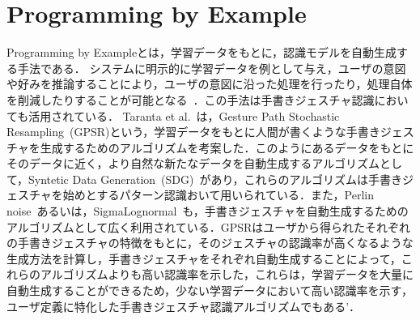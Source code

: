 \section{Programming by Example}
Programming by Exampleとは，学習データをもとに，認識モデルを自動生成する手法である．
システムに明示的に学習データを例として与え，ユーザの意図や好みを推論することにより，ユーザの意図に沿った処理を行ったり，処理自体を削減したりすることが可能となる~\cite{110003743975}．この手法は手書きジェスチャ認識においても活用されている．
Taranta et al.~\cite{Taranta:2016:RPA:2984511.2984525}は，Gesture Path Stochastic Resampling~(GPSR)という，学習データをもとに人間が書くような手書きジェスチャを生成するためのアルゴリズムを考案した．このようにあるデータをもとにそのデータに近く，より自然な新たなデータを自動生成するアルゴリズムとして，Syntetic Data Generation~(SDG)~\cite{conf/iccv/NavaratnamFC07,Shotton:2011:RHP:2191740.2192047,Galbally_syntheticgeneration,Lundin:2002:SFD:646280.687684,Gatos:2005:SAK:1106779.1106876,Rodriguez-Serrano:2012:SQH:2240326.2240755,Fischer:2013:GLS:2501115.2501123}があり，これらのアルゴリズムは手書きジェスチャを始めとするパターン認識おいて用いられている．また，Perlin noise~\cite{Perlin:1985:IS:325165.325247}あるいは，SigmaLognormal~\cite{SigmaLognormal}も，手書きジェスチャを自動生成するためのアルゴリズムとして広く利用されている．GPSRはユーザから得られたそれぞれの手書きジェスチャの特徴をもとに，そのジェスチャの認識率が高くなるような生成方法を計算し，手書きジェスチャをそれぞれ自動生成することによって，これらのアルゴリズムよりも高い認識率を示した，これらは，学習データを大量に自動生成することができるため，少ない学習データにおいて高い認識率を示す，ユーザ定義に特化した手書きジェスチャ認識アルゴリズムでもある’．

